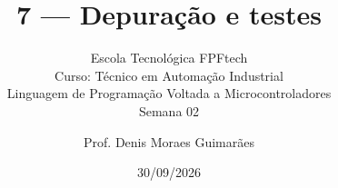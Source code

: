 \title{7 — Depuração e testes}
\subtitle{\texorpdfstring{Escola Tecnológica FPFtech\\[0.2cm]
Curso: Técnico em Automação Industrial\\[0.2cm]
\small Linguagem de Programação Voltada a Microcontroladores\\[0.15cm]
Semana 02}{FPFtech — Técnico em Automação Industrial — Semana 02}}
\author{Prof. Denis Moraes Guimarães}
\date{30/09/2026}
